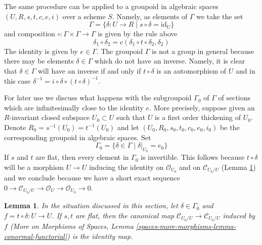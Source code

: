 \documentclass{stacks-project}
\theoremstyle{plain}
\newtheorem{lemma}[subsection]{Lemma}
\theoremstyle{definition}
\theoremstyle{remark}
\numberwithin{equation}{subsection}
\begin{document}
\medskip\noindent
The same procedure can be applied to a groupoid in algebraic
spaces $(U, R, s, t, c, e, i)$ over a scheme $S$.
Namely, as elements of $\Gamma$ we take the set
$$
\Gamma = \{\delta : U \to R \mid s \circ \delta = \text{id}_U\}
$$
and composition $\circ : \Gamma \times \Gamma \to \Gamma$
is given by the rule above
\begin{equation}
\label{equation-composition}
\delta_1 \circ \delta_2 = c(\delta_1 \circ t \circ \delta_2, \delta_2)
\end{equation}
The identity is given by $e \in \Gamma$. The groupoid $\Gamma$ is not a
group in general because there may be elements $\delta \in \Gamma$
which do not have an inverse. Namely, it is clear that $\delta \in \Gamma$
will have an inverse if and only if $t \circ \delta$ is an automorphism
of $U$ and in this case
$\delta^{-1} = i \circ \delta \circ (t \circ \delta)^{-1}$.

\medskip\noindent
For later use we discuss what happens with the subgroupoid
$\Gamma_0$ of $\Gamma$ of sections which are infinitesimally
close to the identity $e$. More precisely, suppose given an
$R$-invariant closed subspace $U_0 \subset U$ such that $U$
is a first order thickening of $U_0$. Denote
$R_0 = s^{-1}(U_0) = t^{-1}(U_0)$ and let
$(U_0, R_0, s_0, t_0, c_0, e_0, i_0)$ be the corresponding
groupoid in algebraic spaces. Set
$$
\Gamma_0 = \{\delta \in \Gamma \mid \delta|_{U_0} = e_0\}
$$
If $s$ and $t$ are flat, then every element in $\Gamma_0$
is invertible. This follows because $t \circ \delta$
will be a morphism $U \to U$ inducing the identity on
$\mathcal{O}_{U_0}$ and on $\mathcal{C}_{U_0/U}$
(Lemma \ref{lemma-idenity-on-conormal})
and we conclude because we have a short exact
sequence
$0 \to \mathcal{C}_{U_0/U} \to \mathcal{O}_U \to \mathcal{O}_{U_0} \to 0$.

\begin{lemma}
\label{lemma-idenity-on-conormal}
In the situation discussed in this section, let $\delta \in \Gamma_0$
and $f = t \circ \delta : U \to U$. If $s, t$ are flat, then the
canonical map $\mathcal{C}_{U_0/U} \to \mathcal{C}_{U_0/U}$ induced by $f$
(More on Morphisms of Spaces, Lemma
\ref{spaces-more-morphisms-lemma-conormal-functorial})
is the identity map.
\end{lemma}
\end{document}
